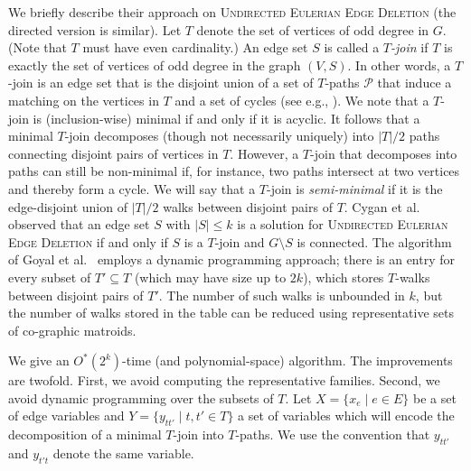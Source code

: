 \documentclass[10pt,a4paper]{article}
\begin{document}
We briefly describe their approach on \textsc{Undirected Eulerian Edge Deletion} (the directed version is similar).
Let $T$ denote the set of vertices of odd degree in $G$. (Note that $T$ must have even cardinality.)
An edge set $S$ is called a \emph{$T$-join} if $T$ is exactly the set of vertices of odd degree in the graph $(V, S)$.
In other words, a $T$-join is an edge set that is the disjoint union of a set of $T$-paths $\mathcal{P}$ that induce a matching on the vertices in $T$ and a set of cycles (see e.g., \cite{Schrijver}). 
We note that a $T$-join is (inclusion-wise) minimal if and only if it is acyclic. 
It follows that a minimal $T$-join decomposes (though not necessarily uniquely) into $|T|/2$ paths connecting disjoint pairs of vertices in $T$.
However, a $T$-join that decomposes into paths can still be non-minimal if, for instance, two paths intersect at two vertices and thereby form a cycle.
We will say that a $T$-join is \emph{semi-minimal} if it is the edge-disjoint union of $|T|/2$ walks between disjoint pairs of $T$.
Cygan et al.~\cite{CyganMPPS14euler} observed that an edge set $S$ with $|S| \le k$ is a solution for \textsc{Undirected Eulerian Edge Deletion} if and only if $S$ is a $T$-join and $G \setminus S$ is connected.
The algorithm of Goyal et al.~\cite{GoyalMPPS18even} employs a dynamic programming approach; there is an entry for every subset of $T' \subseteq T$ (which may have size up to $2k$), which stores $T$-walks between disjoint pairs of $T'$.
The number of such walks is unbounded in $k$, but the number of walks stored in the table can be reduced using representative sets of co-graphic matroids.

We give an $O^*(2^k)$-time (and polynomial-space) algorithm.
The improvements are twofold.
First, we avoid computing the representative families.
Second, we avoid dynamic programming over the subsets of $T$.
Let $X = \{ x_e \mid e \in E \}$ be a set of edge variables
and $Y = \{y_{tt'} \mid t, t' \in T\}$ a set of variables which will encode
the decomposition of a minimal $T$-join into $T$-paths. We use the convention
that $y_{tt'}$ and $y_{t't}$ denote the same variable. 
\end{document}
